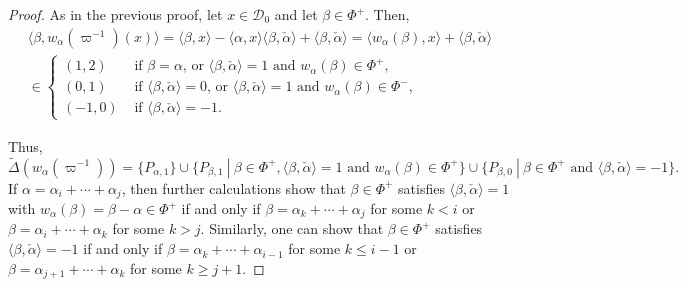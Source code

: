 \documentclass{article}
\newcommand{\calpha}{\check{\alpha}}
\theoremstyle{plain}
\theoremstyle{definition}
\begin{document}
    \begin{proof}
        As in the previous proof, let $x\in\mathcal{D}_0$ and let $\beta\in\Phi^+$. Then,
        \begin{align*}
            \langle\beta,w_\alpha(\varpi^{-1})(x)\rangle=\langle\beta,x\rangle-\langle\alpha,x\rangle\langle\beta,\calpha\rangle+\langle\beta,\calpha\rangle=\langle w_\alpha(\beta),x\rangle+\langle\beta,\calpha\rangle\\
            \in
            \begin{cases}
                (1,2) &\text{ if } \beta=\alpha \text{, or } \langle\beta,\calpha\rangle=1 \text{ and } w_\alpha(\beta)\in\Phi^+,\\
                (0,1) &\text{ if } \langle\beta,\calpha\rangle=0 \text{, or }\langle\beta,\calpha\rangle=1 \text{ and }w_\alpha(\beta)\in\Phi^-,\\
                (-1,0) &\text{ if } \langle\beta,\calpha\rangle=-1.
            \end{cases}
        \end{align*}
    
        Thus,
        \begin{equation*}
            \widetilde{\Delta}(w_\alpha(\varpi^{-1}))=\{P_{\alpha,1}\}\cup\{P_{\beta,1}\ |\ \beta\in\Phi^+,\langle\beta,\calpha\rangle=1 \text{ and }w_\alpha(\beta)\in\Phi^+\}\cup\{P_{\beta,0}\ |\ \beta\in\Phi^+\text{ and }\langle\beta,\calpha\rangle=-1\}.
        \end{equation*}
        If $\alpha=\alpha_i+\cdots+\alpha_j$, then further calculations show that $\beta\in\Phi^+$ satisfies $\langle\beta,\calpha\rangle=1$ with $w_\alpha(\beta)=\beta-\alpha\in\Phi^+$ if and only if $\beta=\alpha_k+\cdots+\alpha_j$ for some $k<i$ or $\beta=\alpha_i+\cdots+\alpha_k$ for some $k>j$. Similarly, one can show that $\beta\in\Phi^+$ satisfies $\langle\beta,\calpha\rangle=-1$ if and only if $\beta=\alpha_k+\cdots+\alpha_{i-1}$ for some $k\leq i-1$ or $\beta=\alpha_{j+1}+\cdots+\alpha_k$ for some $k\geq j+1$.
    \end{proof}
\end{document}
